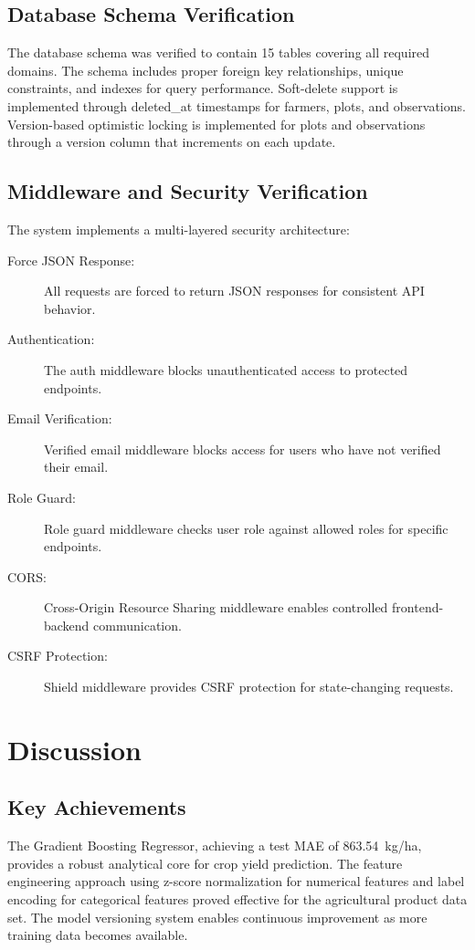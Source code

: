 \subsection{Database Schema Verification}

The database schema was verified to contain 15 tables covering all required domains. The schema includes proper foreign key relationships, unique constraints, and indexes for query performance. Soft-delete support is implemented through deleted\_at timestamps for farmers, plots, and observations. Version-based optimistic locking is implemented for plots and observations through a version column that increments on each update.

\subsection{Middleware and Security Verification}

The system implements a multi-layered security architecture:

\begin{description}
  \item[Force JSON Response:] All requests are forced to return JSON responses for consistent API behavior.
  \item[Authentication:] The auth middleware blocks unauthenticated access to protected endpoints.
  \item[Email Verification:] Verified email middleware blocks access for users who have not verified their email.
  \item[Role Guard:] Role guard middleware checks user role against allowed roles for specific endpoints.
  \item[CORS:] Cross-Origin Resource Sharing middleware enables controlled frontend-backend communication.
  \item[CSRF Protection:] Shield middleware provides CSRF protection for state-changing requests.
\end{description}

\section{Discussion}

\subsection{Key Achievements}

The Gradient Boosting Regressor, achieving a test MAE of 863.54~kg/ha, provides a robust analytical core for crop yield prediction. The feature engineering approach using z-score normalization for numerical features and label encoding for categorical features proved effective for the agricultural product data set. The model versioning system enables continuous improvement as more training data becomes available.

